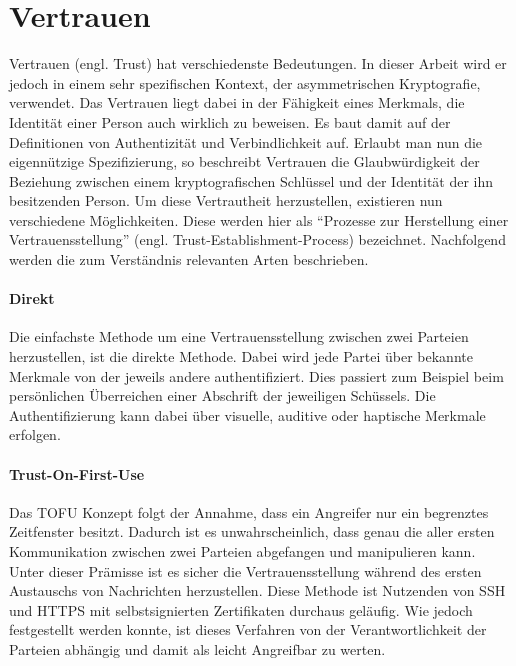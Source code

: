 \section{Vertrauen}
\label{sec:trust}
Vertrauen (engl. Trust) hat verschiedenste Bedeutungen. In dieser Arbeit wird er jedoch in einem sehr spezifischen Kontext, der asymmetrischen Kryptografie, verwendet. Das Vertrauen liegt dabei in der Fähigkeit eines Merkmals, die Identität einer Person auch wirklich zu beweisen. Es baut damit auf der Definitionen von Authentizität und Verbindlichkeit auf\cite{Perrin2010}. Erlaubt man nun die eigennützige Spezifizierung, so beschreibt Vertrauen die Glaubwürdigkeit der Beziehung zwischen einem kryptografischen Schlüssel und der Identität der ihn besitzenden Person. Um diese Vertrautheit herzustellen, existieren nun verschiedene Möglichkeiten. Diese werden hier als ``Prozesse zur Herstellung einer Vertrauensstellung'' (engl. Trust-Establishment-Process) bezeichnet. Nachfolgend werden die zum Verständnis relevanten Arten beschrieben.

\paragraph{Direkt}
Die einfachste Methode um eine Vertrauensstellung zwischen zwei Parteien herzustellen, ist die direkte Methode. Dabei wird jede Partei über bekannte Merkmale von der jeweils andere authentifiziert. Dies passiert zum Beispiel beim persönlichen Überreichen einer Abschrift der jeweiligen Schüssels. Die Authentifizierung kann dabei über visuelle, auditive oder haptische Merkmale erfolgen.

\paragraph{Trust-On-First-Use}
Das \ac{TOFU} Konzept folgt der Annahme, dass ein Angreifer nur ein begrenztes Zeitfenster besitzt. Dadurch ist es unwahrscheinlich, dass genau die aller ersten Kommunikation zwischen zwei Parteien abgefangen und manipulieren kann. Unter dieser Prämisse ist es sicher die Vertrauensstellung während des ersten Austauschs von Nachrichten herzustellen. Diese Methode ist Nutzenden von \ac{SSH} und \acs{HTTPS} mit selbstsignierten Zertifikaten durchaus geläufig. Wie jedoch festgestellt werden konnte, ist dieses Verfahren von der Verantwortlichkeit der Parteien abhängig und damit als leicht Angreifbar zu werten\cite{Wendlandt2008}.

